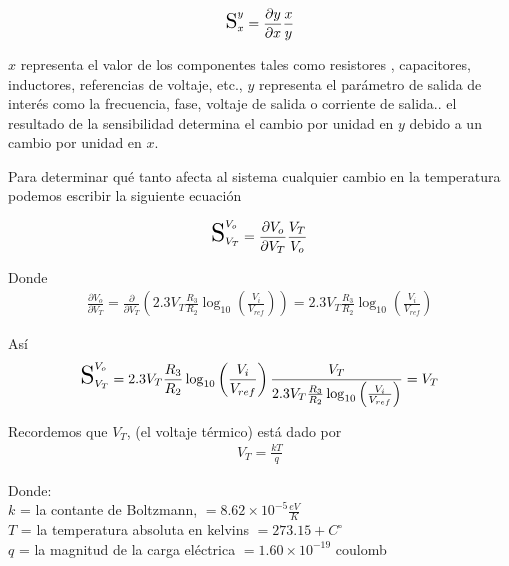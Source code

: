 \documentclass{article}
\begin{document}
\begin{tcolorbox}[colback=red!5!white,colframe=red!75!black,arc=0mm,boxrule=0mm,width=(\linewidth+0.5cm),extrude right by=-1.5cm]
	\begin{equation}
		\scalebox{1.5}{S}_x^{y} = \frac{\partial y}{\partial x} \frac{x}{y}
	\end{equation}
\end{tcolorbox}

\noindent $x$ representa el valor de los componentes tales como resistores , capacitores, inductores, referencias de voltaje, etc., $y$ representa el parámetro de salida de interés como la frecuencia, fase, voltaje de salida o corriente de salida.. el resultado de la sensibilidad determina el cambio por unidad en $y$ debido a un cambio por unidad en $x$.

\noindent Para determinar qué tanto afecta al sistema cualquier cambio en la temperatura podemos escribir la siguiente ecuación

\begin{align}
	\scalebox{1.8}{S}_{V_T}^{V_o} = \frac{\partial V_o}{\partial V_T} \frac{V_T}{V_o}
\end{align}

\noindent Donde
\begin{align}
	\frac{\partial V_o}{\partial V_T} = \frac{\partial}{\partial V_T}\left( 2.3V_T \frac{R_3}{R_2} \log_{10} \left(\frac{V_i}{V_{ref}}\right) \right) = 2.3V_T \frac{R_3}{R_2}\log_{10}\left( \frac{V_i}{V_{ref}} \right)
\end{align}

\noindent Así
\begin{align}
	\scalebox{1.8}{S}_{V_T}^{V_o} = 2.3V_T \frac{R_3}{R_2}\log_{10}\left( \frac{V_i}{V_{ref}} \right) \frac{V_T}{ 2.3V_T \frac{R_3}{R_2} \log_{10} \left( \frac{V_i}{V_{ref}} \right) } = V_T
\end{align}

Recordemos que $V_T$, (el voltaje térmico) está dado por
\begin{align}
	V_T = \frac{kT}{q}
\end{align}

\noindent Donde:\\
$k$ = la contante de Boltzmann, $ = 8.62 \times 10^{-5} \frac{eV}{K}$\\
$T$ =  la temperatura absoluta en kelvins $=273.15 + C^{\circ} $\\
$q$ = la magnitud de la carga eléctrica $= 1.60 \times 10^{-19}$ coulomb \\
\end{document}

